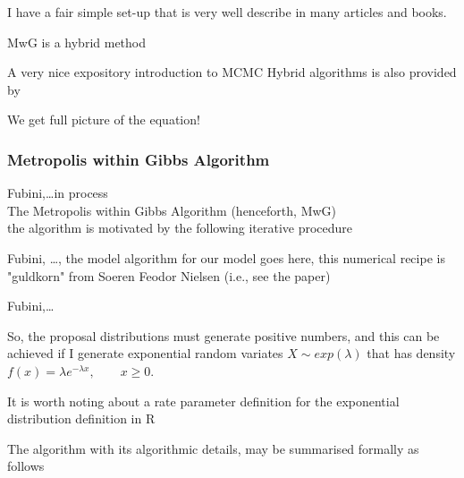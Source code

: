 \documentclass[a4paper,11pt,english]{article}
\begin{document}
		I have a fair simple set-up that is very well describe in many
		articles and books. 
		
		MwG is a hybrid method
		
		A very nice expository introduction to MCMC Hybrid algorithms is also provided by %

		We get full picture of the equation!
				
		
	
			\subsubsection{Metropolis within Gibbs Algorithm}
			
		    Fubini,\ldots in process \\
		    
		    \noindent The Metropolis within Gibbs Algorithm (henceforth, MwG)  \\ 
					
			the algorithm is motivated by the following iterative procedure
	
			Fubini, \ldots, the model algorithm for our model goes here, this numerical recipe is "guldkorn" from Soeren Feodor Nielsen 
			(i.e., see the paper)	
		
			Fubini,\ldots
			
			So, the proposal distributions must generate positive numbers, and this can be achieved if I generate exponential random variates
			$X\sim exp\left(\lambda\right)$ that has density $f\left(x\right) = \lambda e^{-\lambda x}, \text{ } \text{ } \text{ }\text{} x\geq 0$.			
	
			It is worth noting about a rate parameter definition for the exponential distribution definition in R
			
			The algorithm with its algorithmic details, may be summarised formally as follows
			

\end{document}
